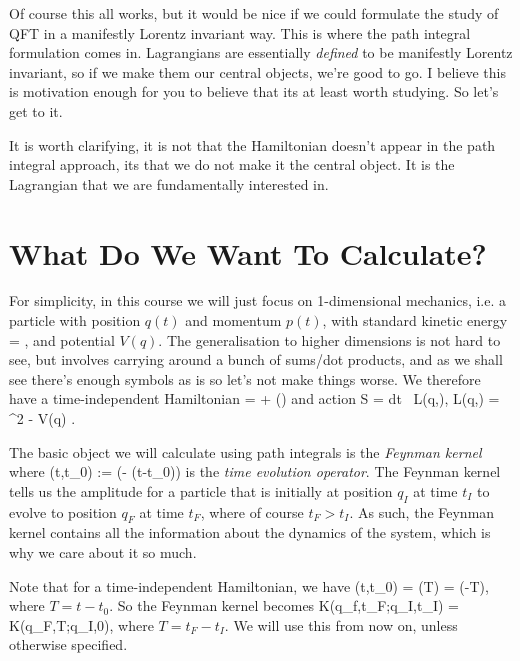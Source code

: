 Of course this all works, but it would be nice if we could formulate the study of QFT in a manifestly Lorentz invariant way. This is where the path integral formulation comes in. Lagrangians are essentially \textit{defined} to be manifestly Lorentz invariant, so if we make them our central objects, we're good to go. I believe this is motivation enough for you to believe that its at least worth studying. So let's get to it.

\br 
    It is worth clarifying, it is not that the Hamiltonian doesn't appear in the path integral approach, its that we do not make it the central object. It is the Lagrangian that we are fundamentally interested in. 
\er 

\section{What Do We Want To Calculate?}

For simplicity, in this course we will just focus on 1-dimensional mechanics, i.e. a particle with position $q(t)$ and momentum $p(t)$, with standard kinetic energy 
\bse 
     = ,
\ese 
and potential $V(q)$. The generalisation to higher dimensions is not hard to see, but involves carrying around a bunch of sums/dot products, and as we shall see there's enough symbols as is so let's not make things worse. We therefore have a time-independent Hamiltonian 
\be
\label{eqn:Hamiltonian}
     =  + ()
\ee 
and action 
\be
\label{eqn:ActionAndLagrangian}
    S = \int dt \, L(q,), \qquad L(q,) = ^2 - V(q) . 
\ee 

The basic object we will calculate using path integrals is the \textit{Feynman kernel}
\noindent where
\be 
\label{eqn:TimeEvolutionOperator}
    (t,t_0) := \exp\bigg(- (t-t_0)\bigg)
\ee 
is the \textit{time evolution operator}. The Feynman kernel tells us the amplitude for a particle that is initially at position $q_I$ at time $t_I$ to evolve to position $q_F$ at time $t_F$, where of course $t_F>t_I$. As such, the Feynman kernel contains all the information about the dynamics of the system, which is why we care about it so much.

\br 
    Note that for a time-independent Hamiltonian, we have 
    \bse 
        (t,t_0) = (T) = \exp\bigg(-T\bigg),
    \ese
    where $T=t-t_0$. So the Feynman kernel becomes 
    \bse 
        K(q_f,t_F;q_I,t_I) = K(q_F,T;q_I,0),
    \ese 
    where $T=t_F-t_I$. We will use this from now on, unless otherwise specified.
\er 

